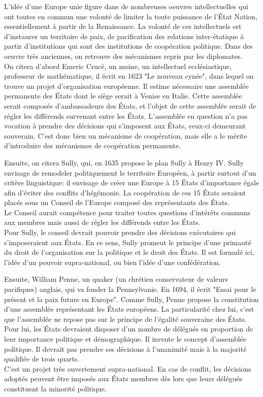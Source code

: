 \documentclass[10pt, a4paper, openany]{book}
\begin{document}
L'idée d'une Europe unie figure dans de nombreuses oeuvres intellectuelles qui ont toutes en commun une volonté de limiter la toute puissance de l'État Nation, essentiellement à partir de la Renaissance. La volonté de ces intellectuels est d'instaurer un territoire de paix, de pacification des relations inter-étatique à partir d'institutions qui sont des institutions de coopération politique. Dans des oeuvre très anciennes, on retrouve des mécanismes repris par les diplomates. \\
On citera d'abord Emeric Crucé, un moine, un intellectuel ecclésiastique, professeur de mathématique, il écrit en 1623 "Le nouveau cynée", dans lequel on trouve un projet d'organisation européenne. Il estime nécessaire une assemblée permanente des États dont le siège serait à Venise en Italie. Cette assemblée serait composée d'ambassadeurs des États, et l'objet de cette assemblée serait de régler les différends survenant entre les États. L'assemblée en question n'a pas vocation à prendre des décisions qui s'imposent aux États, ceux-ci demeurant souverain. C'est donc bien un mécanisme de coopération, mais elle a le mérite d'introduire des mécanismes de coopération permanente. 


Ensuite, on citera Sully, qui, en 1635 propose le plan Sully à Henry IV. Sully envisage de remodeler politiquement le territoire Européen, à partir surtout d'un critère linguistique: il envisage de créer une Europe à 15 États d'importance égale afin d'éviter des conflits d'hégémonie. La coopération de ces 15 États seraient placés sous un Conseil de l'Europe composé des représentants des États. \\
Le Conseil aurait compétence pour traiter toutes questions d'intérêts communs aux membres mais aussi de régler les différends entre les États. \\
Pour Sully, le conseil devrait pouvoir prendre des décisions exécutoires qui s'imposeraient aux États. En ce sens, Sully promeut le principe d'une primauté du droit de l'organisation sur la politique et le droit des États. Il est formulé ici, l'idée d'un pouvoir supra-national, ou bien l'idée d'une confédération. 


Ensuite, William Penne, un quaker (un chrétien conservateur de valeurs pacifiques) anglais, qui va fonder la Pennsylvanie. En 1694, il écrit "Essai pour le présent et la paix future en Europe". Comme Sully, Penne propose la constitution d'une assemblée représentant les États européens. La particularité chez lui, c'est que l'assemblée ne repose pas sur le principe de l'égalité souveraine des États. Pour lui, les États devraient disposer d'un nombre de délégués en proportion de leur importance politique et démographique. Il invente le concept d'assemblée politique. Il devrait pas prendre ses décisions à l'unanimité mais à la majorité qualifiée de trois quarts. \\
C'est un projet très ouvertement supra-national. En cas de conflit, les décisions adoptés peuvent être imposés aux États membres dès lors que leurs délégués constituent la minorité politique. 
\end{document}
